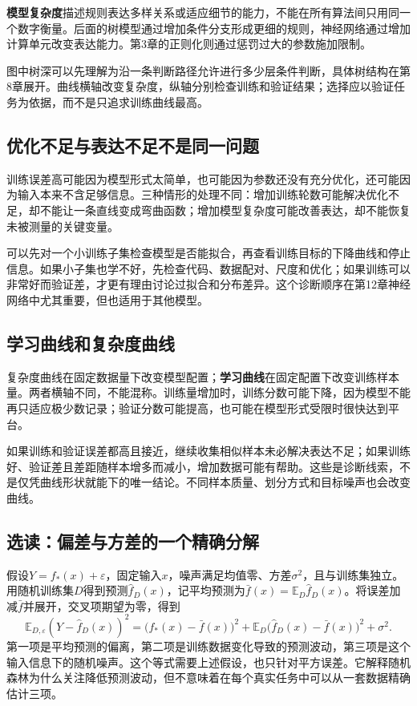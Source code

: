 \textbf{模型复杂度}描述规则表达多样关系或适应细节的能力，不能在所有算法间只用同一个数字衡量。后面的树模型通过增加条件分支形成更细的规则，神经网络通过增加计算单元改变表达能力。第3章的正则化则通过惩罚过大的参数施加限制。

图中树深可以先理解为沿一条判断路径允许进行多少层条件判断，具体树结构在第8章展开。曲线横轴改变复杂度，纵轴分别检查训练和验证结果；选择应以验证任务为依据，而不是只追求训练曲线最高。

\subsection{优化不足与表达不足不是同一问题}
训练误差高可能因为模型形式太简单，也可能因为参数还没有充分优化，还可能因为输入本来不含足够信息。三种情形的处理不同：增加训练轮数可能解决优化不足，却不能让一条直线变成弯曲函数；增加模型复杂度可能改善表达，却不能恢复未被测量的关键变量。

可以先对一个小训练子集检查模型是否能拟合，再查看训练目标的下降曲线和停止信息。如果小子集也学不好，先检查代码、数据配对、尺度和优化；如果训练可以非常好而验证差，才更有理由讨论过拟合和分布差异。这个诊断顺序在第12章神经网络中尤其重要，但也适用于其他模型。

\subsection{学习曲线和复杂度曲线}
复杂度曲线在固定数据量下改变模型配置；\textbf{学习曲线}在固定配置下改变训练样本量。两者横轴不同，不能混称。训练量增加时，训练分数可能下降，因为模型不能再只适应极少数记录；验证分数可能提高，也可能在模型形式受限时很快达到平台。

如果训练和验证误差都高且接近，继续收集相似样本未必解决表达不足；如果训练好、验证差且差距随样本增多而减小，增加数据可能有帮助。这些是诊断线索，不是仅凭曲线形状就能下的唯一结论。不同样本质量、划分方式和目标噪声也会改变曲线。

\subsection{选读：偏差与方差的一个精确分解}
假设$Y=f_*(x)+\varepsilon$，固定输入$x$，噪声满足均值零、方差$\sigma^2$，且与训练集独立。用随机训练集$D$得到预测$\hat f_D(x)$，记平均预测为$\bar f(x)=\mathbb E_D\hat f_D(x)$。将误差加减$\bar f$并展开，交叉项期望为零，得到
\[
\mathbb E_{D,\varepsilon}(Y-\hat f_D(x))^2
=\bigl(f_*(x)-\bar f(x)\bigr)^2
+\mathbb E_D\bigl(\hat f_D(x)-\bar f(x)\bigr)^2+\sigma^2.
\]
第一项是平均预测的偏离，第二项是训练数据变化导致的预测波动，第三项是这个输入信息下的随机噪声。这个等式需要上述假设，也只针对平方误差。它解释随机森林为什么关注降低预测波动，但不意味着在每个真实任务中可以从一套数据精确估计三项。

